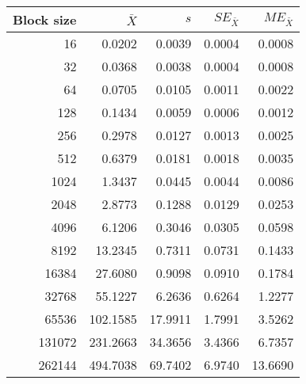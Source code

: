 \begin{tabular}{rrrrr}\toprule
{\small Block size} & $\bar{X}$ & $s$ & $SE_{\bar{X}}$ & $ME_{\bar{X}}$ \\\midrule
16 & 0.0202 & 0.0039 & 0.0004 & 0.0008\\
32 & 0.0368 & 0.0038 & 0.0004 & 0.0008\\
64 & 0.0705 & 0.0105 & 0.0011 & 0.0022\\
128 & 0.1434 & 0.0059 & 0.0006 & 0.0012\\
256 & 0.2978 & 0.0127 & 0.0013 & 0.0025\\
512 & 0.6379 & 0.0181 & 0.0018 & 0.0035\\
1024 & 1.3437 & 0.0445 & 0.0044 & 0.0086\\
2048 & 2.8773 & 0.1288 & 0.0129 & 0.0253\\
4096 & 6.1206 & 0.3046 & 0.0305 & 0.0598\\
8192 & 13.2345 & 0.7311 & 0.0731 & 0.1433\\
16384 & 27.6080 & 0.9098 & 0.0910 & 0.1784\\
32768 & 55.1227 & 6.2636 & 0.6264 & 1.2277\\
65536 & 102.1585 & 17.9911 & 1.7991 & 3.5262\\
131072 & 231.2663 & 34.3656 & 3.4366 & 6.7357\\
262144 & 494.7038 & 69.7402 & 6.9740 & 13.6690\\
\bottomrule
\end{tabular}
